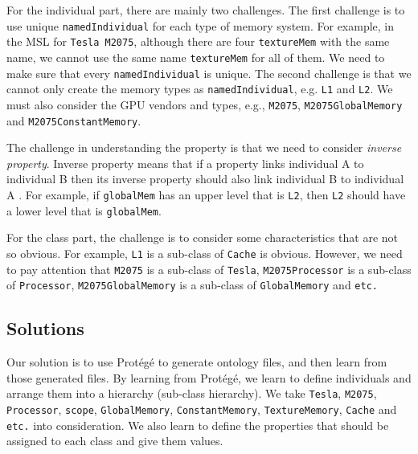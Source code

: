 \documentclass{sig-alternate}
\begin{document}
For the individual part, there are mainly two challenges. The first challenge is to use unique \texttt{namedIndividual} for each type of memory system. For example, in the MSL for \texttt{Tesla M2075}, although there are four \texttt{textureMem} with the same name, we cannot use the same name \texttt{textureMem} for all of them. We need to make sure that every \texttt{namedIndividual} is unique. The second challenge is that we cannot only create the memory types as \texttt{namedIndividual}, e.g. \texttt{L1} and \texttt{L2}. We must also consider the GPU vendors and types, e.g., \texttt{M2075}, \texttt{M2075GlobalMemory} and \texttt{M2075ConstantMemory}.

The challenge in understanding the property is that we need to consider \textit{inverse property}. Inverse property means that if a property links individual A to individual B then its inverse property should also link individual B to individual A \cite{what1}. For example, if \texttt{globalMem} has an upper level that is \texttt{L2}, then \texttt{L2} should have a lower level that is \texttt{globalMem}. 

For the class part, the challenge is to consider some characteristics that are not so obvious. For example, \texttt{L1} is a sub-class of \texttt{Cache} is obvious. However, we need to pay attention that \texttt{M2075} is a sub-class of \texttt{Tesla}, \texttt{M2075Processor} is a sub-class of \texttt{Processor}, \texttt{M2075GlobalMemory} is a sub-class of \texttt{GlobalMemory} and \texttt{etc.}

\subsection{Solutions}
Our solution is to use Prot{\'e}g{\'e} \cite{protege} to generate ontology files, and then learn from those generated files. By learning from Prot{\'e}g{\'e}, we learn to define individuals and arrange them into a hierarchy (sub-class hierarchy). We take \texttt{Tesla}, \texttt{M2075}, \texttt{Processor}, \texttt{scope}, \texttt{GlobalMemory}, \texttt{ConstantMemory}, \texttt{TextureMemory}, \texttt{Cache} and \texttt{etc.} into consideration. We also learn to define the properties that should be assigned to each class and give them values.
\end{document}

